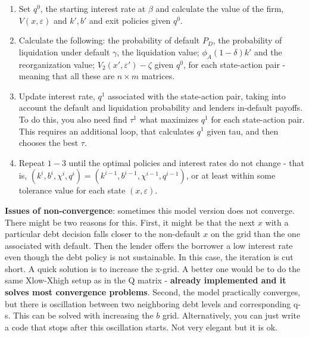\documentclass[12pt]{article}
\begin{document}
\begin{enumerate}
    \item Set $q^0$, the starting interest rate at $\beta$ and calculate the value of the firm, $V(x,\varepsilon)$ and $k', b'$ and exit policies given  $q^0$. 
    \item Calculate the following: the probability of default $P_D$, the probability of liquidation under default $\gamma$, the liquidation value; $\phi_A (1-\delta) k'$ and the reorganization value; $V_2 (x', \varepsilon') - \zeta$ given $q^0$, for each state-action pair - meaning that all these are $n \times m$ matrices.
    \item Update interest rate, $q^1$ associated with the state-action pair, taking into account the default and liquidation probability and lenders in-default payoffs. To do this, you also need find $\tau^1$ what maximizes $q^1$ for each state-action pair. This requires an additional loop, that calculates $q^1$ given tau, and then chooses the best $\tau$.
    \item Repeat $1-3$ until the optimal policies and interest rates do not change - that is, $ (k^{i},b^{i},\chi^{i},q^{i}) = (k^{i-1},b^{i-1},\chi^{i-1},q^{i-1}) $, or at least within some tolerance value for each state $(x,\varepsilon)$.
\end{enumerate}
\textbf{Issues of non-convergence}: sometimes this model version does not converge. There might be two reasons for this. First, it might be that the next $x$ with a particular debt decision falls closer to the non-default $x$ on the grid than the one associated with default. Then the lender offers the borrower a low interest rate even though the debt policy is not sustainable. In this case, the iteration is cut short. A quick solution is to increase the x-grid. A better one would be to do the same Xlow-Xhigh setup as in the Q matrix - \textbf{already implemented and it solves most convergence problems}. Second, the model practically converges, but there is oscillation between two neighboring debt levels and corresponding q-s. This can be solved with increasing the $b$ grid. Alternatively, you can just write a code that stops after this oscillation starts. Not very elegant but it is ok.



\newpage
\end{document}

